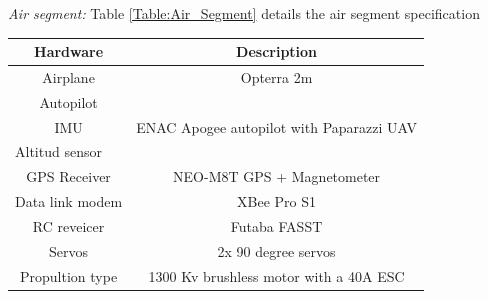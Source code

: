 \textit{Air segment:} Table \ref{Table:Air_Segment} details the air segment specification 
\begin{table}[H]
\centering
\begin{tabular}{|c|c|}
\hline
Hardware                             & Description                                                                                                                                                          \\ \hline
Airplane                             & Opterra 2m                                                                                                                                                           \\ \hline
Autopilot                            & \multirow{3}{*}{ENAC Apogee autopilot with Paparazzi UAV}                                                                                                          \\ \cline{1-1}
IMU                                  &                                                                                                                                                                      \\ \cline{1-1}
\multicolumn{1}{|l|}{Altitud sensor} &                                                                                                                                                                      \\ \hline
GPS Receiver                         & NEO-M8T GPS + Magnetometer                                                                                                                                           \\ \hline
Data link modem                      & XBee Pro S1                                                                                                                                                          \\ \hline
RC reveicer                          & Futaba FASST                                                                                                                                                         \\ \hline
Servos                               & 2x 90 degree servos                                                                                                                                                  \\ \hline
Propultion type                      & 1300 Kv brushless motor with a 40A ESC                                                                                                                               \\ \hline

\end{tabular}
\end{table}
